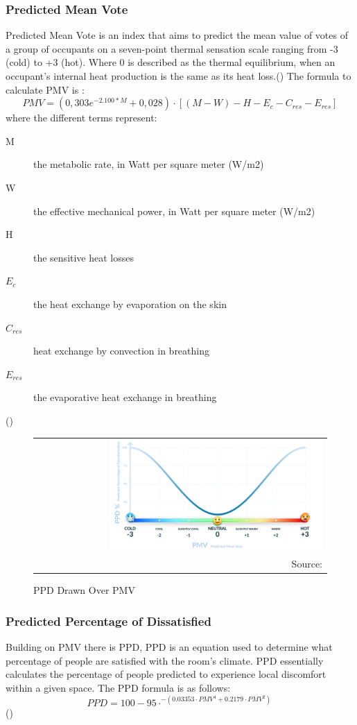 \documentclass[12pt,a4paper]{article}
\newcommand{\imagesource}[1]{{\footnotesize Source: #1}}
\begin{document}
\subsubsection{Predicted Mean Vote}
Predicted Mean Vote is an index that aims to predict the mean value of votes of a group of occupants on a seven-point thermal sensation scale ranging from -3 (cold) to +3 (hot). Where 0 is described as the thermal equilibrium, when an occupant’s internal heat production is the same as its heat loss.(\cite{fanger1970}) The formula to calculate PMV is : 
\[PMV = (0,303e^{-2.100*M}+0,028)\cdot[(M-W)-H-E_{c}-C_{res}-E_{res}]\]
where the different terms represent:
\begin{description}
	\item[M] the metabolic rate, in Watt per square meter (W/m2)
	\item[W] the effective mechanical power, in Watt per square meter (W/m2)
	\item[H] the sensitive heat losses
	\item[$E_{c}$] the heat exchange by evaporation on the skin
	\item[$C_{res}$] heat exchange by convection in breathing
	\item[$E_{res}$] the evaporative heat exchange in breathing
\end{description}
(\cite{Silva})

\begin{figure}[h]
	\caption{PPD Drawn Over PMV}
	\centering
	\begin{tabular}{ @{} r @{} }
		\includegraphics[width=0.75\textwidth]{pmv_ppd} \\
		\imagesource{\cite{guenther_2021}}
	\end{tabular}
\end{figure}

\subsubsection{Predicted Percentage of Dissatisfied}
Building on PMV there is PPD, PPD is an equation used to determine what percentage of people are satisfied with the room's climate. PPD essentially calculates the percentage of people predicted to experience local discomfort within a given space.
The PPD formula is as follows:
\[PPD = 100-95\cdot^{-(0.03353 \cdot PMV^{4} + 0.2179 \cdot PMV^{2})}\]
(\cite{fanger1970})
  
\end{document}
